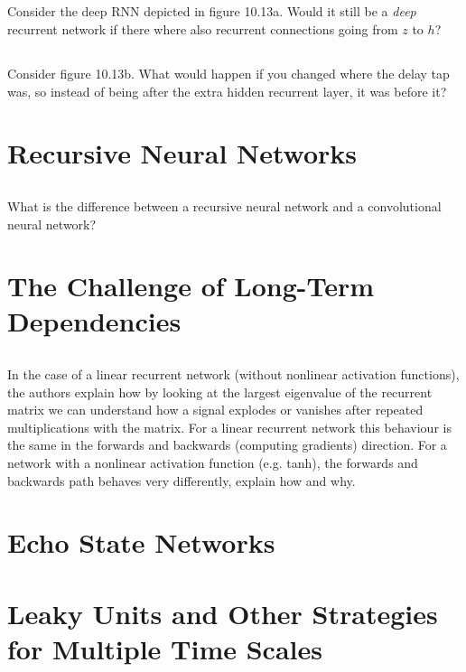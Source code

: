 \documentclass[a4paper]{report} \usepackage{amsmath}
\begin{document}
    \subsection{}
    Consider the deep RNN depicted in figure 10.13a. Would it still be
    a \emph{deep} recurrent network if there where also recurrent
    connections going from $z$ to $h$?
    \subsection{}
    Consider figure 10.13b. What would happen if you changed where the
    delay tap was, so instead of being after the extra hidden
    recurrent layer, it was before it?

    \section{Recursive Neural Networks}
    \subsection{}
    What is the difference between a recursive neural network and a
    convolutional neural network?

    \section{The Challenge of Long-Term Dependencies}
    \subsection{}
    In the case of a linear recurrent network (without nonlinear
    activation functions), the authors explain how by looking at the
    largest eigenvalue of the recurrent matrix we can understand how a
    signal explodes or vanishes after repeated multiplications with
    the matrix. For a linear recurrent network this behaviour is the
    same in the forwards and backwards (computing gradients)
    direction. For a network with a nonlinear activation function
    (e.g. tanh), the forwards and backwards path behaves very
    differently, explain how and why.

    \section{Echo State Networks}

    \section{Leaky Units and Other Strategies for Multiple Time Scales}
\end{document}

